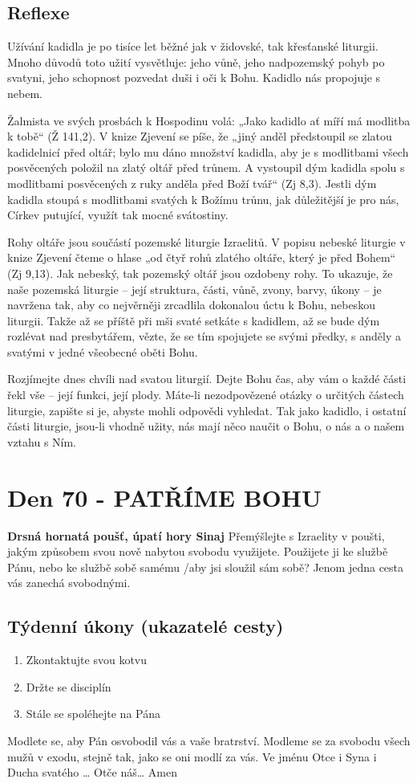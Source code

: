 \documentclass[11pt]{article}
\newcommand{\zacatekDesatyTyden}{
\textbf{Drsná hornatá poušť, úpatí hory Sinaj} \newline 
Přemýšlejte s Izraelity v poušti, jakým způsobem svou nově nabytou svobodu využijete. Použijete ji ke službě Pánu, nebo ke službě sobě samému /aby jsi sloužil sám sobě? Jenom jedna cesta vás zanechá svobodnými.

\subsection*{Týdenní úkony (ukazatelé cesty)}
\begin{enumerate}
  \item Zkontaktujte svou kotvu
  \item Držte se disciplín
  \item Stále se spoléhejte na Pána
\end{enumerate}
Modlete se, aby Pán osvobodil vás a vaše bratrství. \newline
Modleme se za svobodu všech mužů v exodu, stejně tak, jako se oni modlí za vás.\newline
Ve jménu Otce i Syna i Ducha svatého …  Otče náš… Amen
}
\begin{document}
\subsection*{Reflexe}
Užívání kadidla je po tisíce let běžné jak v židovské, tak křesťanské liturgii. Mnoho důvodů toto užití vysvětluje: jeho
vůně, jeho nadpozemský pohyb po svatyni, jeho schopnost pozvedat duši i oči k Bohu. Kadidlo nás propojuje s nebem.

Žalmista ve svých prosbách k Hospodinu volá: „Jako kadidlo ať míří má modlitba k tobě“ (Ž 141,2). V knize Zjevení
se píše, že „jiný anděl předstoupil se zlatou kadidelnicí před oltář; bylo mu dáno množství kadidla, aby je s modlitbami
všech posvěcených položil na zlatý oltář před trůnem. A vystoupil dým kadidla spolu s modlitbami posvěcených z ruky
anděla před Boží tvář“ (Zj 8,3). Jestli dým kadidla stoupá s modlitbami svatých k Božímu trůnu, jak důležitější je pro
nás, Církev putující, využít tak mocné svátostiny.

Rohy oltáře jsou součástí pozemské liturgie Izraelitů. V popisu nebeské liturgie v knize Zjevení čteme o hlase „od čtyř
rohů zlatého oltáře, který je před Bohem“ (Zj 9,13). Jak nebeský, tak pozemský oltář jsou ozdobeny rohy. To ukazuje,
že naše pozemská liturgie – její struktura, části, vůně, zvony, barvy, úkony – je navržena tak, aby co nejvěrněji
zrcadlila dokonalou úctu k Bohu, nebeskou liturgii. Takže až se příště při mši svaté setkáte s kadidlem, až se bude dým
rozlévat nad presbytářem, vězte, že se tím spojujete se svými předky, s anděly a svatými v jedné všeobecné oběti Bohu.

Rozjímejte dnes chvíli nad svatou liturgií. Dejte Bohu čas, aby vám o každé části řekl vše – její funkci, její plody.
Máte-li nezodpovězené otázky o určitých částech liturgie, zapište si je, abyste mohli odpovědi vyhledat. Tak jako
kadidlo, i ostatní části liturgie, jsou-li vhodně užity, nás mají něco naučit o Bohu, o nás a o našem vztahu s Ním.





\newpage
\section{Den 70 - PATŘÍME BOHU}
\zacatekDesatyTyden
\end{document}
